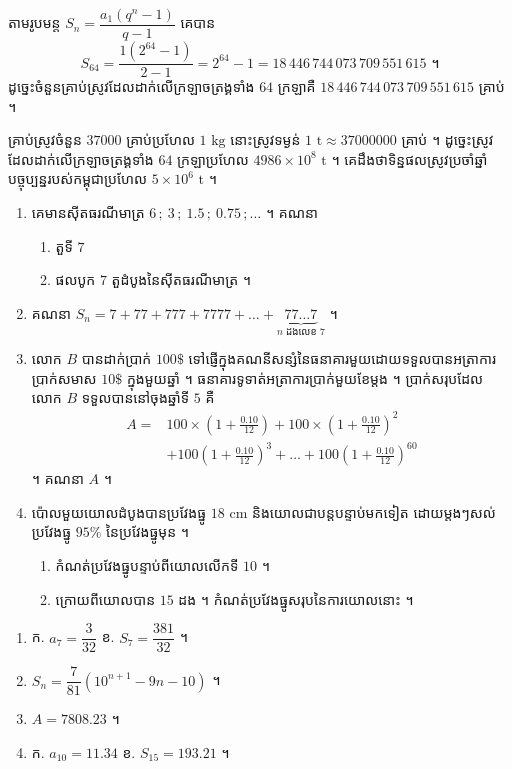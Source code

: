 តាមរូបមន្ត $S_n = \dfrac{a_1(q^n - 1)}{q - 1}$ គេបាន
\[ S_{64} = \frac{1(2^{64} - 1)}{2 - 1} = 2^{64} - 1 = 18\,446\,744\,073\,709\,551\,615 \text{ ។} \]
ដូច្នេះចំនួនគ្រាប់ស្រូវដែលដាក់លើក្រឡាចត្រង្គទាំង $64$ ក្រឡាគឺ $18\,446\,744\,073\,709\,551\,615$ គ្រាប់ ។

គ្រាប់ស្រូវចំនួន $37000$ គ្រាប់ប្រហែល $1\text{ kg}$ នោះស្រូវទម្ងន់ $1\text{ t} \approx 37000000$ គ្រាប់ ។ ដូច្នេះស្រូវដែលដាក់លើក្រឡាចត្រង្គទាំង $64$ ក្រឡាប្រហែល $4986 \times 10^8\text{ t}$ ។ គេដឹងថាទិន្នផលស្រូវប្រចាំឆ្នាំបច្ចុប្បន្នរបស់កម្ពុជាប្រហែល $5 \times 10^6\text{ t}$ ។

\begin{pro}
\begin{enumerate}[1]
  \item គេមានស៊ីតធរណីមាត្រ $6\,;\ 3\,;\ 1.5\,;\ 0.75\,;\ldots$ ។ គណនា
  \begin{enumerate}[a]
    \item តួទី $7$
    \item ផលបូក $7$ តួដំបូងនៃស៊ីតធរណីមាត្រ ។
  \end{enumerate}
  \item គណនា $S_n = 7 + 77 + 777 + 7777 + \ldots + \underbrace{77\ldots7}_{n \text{ ដងលេខ } 7}$ ។
  \item លោក $B$ បានដាក់ប្រាក់ $100\$$ ទៅផ្ញើក្នុងគណនីសន្សំនៃធនាគារមួយដោយទទួលបានអត្រាការប្រាក់សមាស $10\$$ ក្នុងមួយឆ្នាំ ។ ធនាគារទូទាត់អត្រាការប្រាក់មួយខែម្តង ។ ប្រាក់សរុបដែលលោក $B$ ទទួលបាននៅចុងឆ្នាំទី $5$ គឺ
  \[ \begin{aligned} A = {}&100 \times \left(1 + \frac{0.10}{12}\right) + 100 \times \left(1 + \frac{0.10}{12}\right)^2\\ &+ 100\left(1 + \frac{0.10}{12}\right)^3 + \ldots + 100\left(1 + \frac{0.10}{12}\right)^{60} \end{aligned} \]
  ។ គណនា $A$ ។
  \item ប៉ោលមួយយោលដំបូងបានប្រវែងធ្នូ $18\text{ cm}$ និងយោលជាបន្តបន្ទាប់មកទៀត ដោយម្តងៗសល់ប្រវែងធ្នូ $95\%$ នៃប្រវែងធ្នូមុន ។
  \begin{enumerate}[a]
    \item កំណត់ប្រវែងធ្នូបន្ទាប់ពីយោលលើកទី $10$ ។
    \item ក្រោយពីយោលបាន $15$ ដង ។ កំណត់ប្រវែងធ្នូសរុបនៃការយោលនោះ ។
  \end{enumerate}
\end{enumerate}
\ans
\begin{enumerate}[1]
  \item ក. $a_7 = \dfrac{3}{32}$ \quad ខ. $S_7 = \dfrac{381}{32}$ ។
  \item $S_n = \dfrac{7}{81}(10^{n+1} - 9n - 10)$ ។
  \item $A = 7808.23$ ។
  \item ក. $a_{10} = 11.34$ \quad ខ. $S_{15} = 193.21$ ។
\end{enumerate}
\end{pro}

